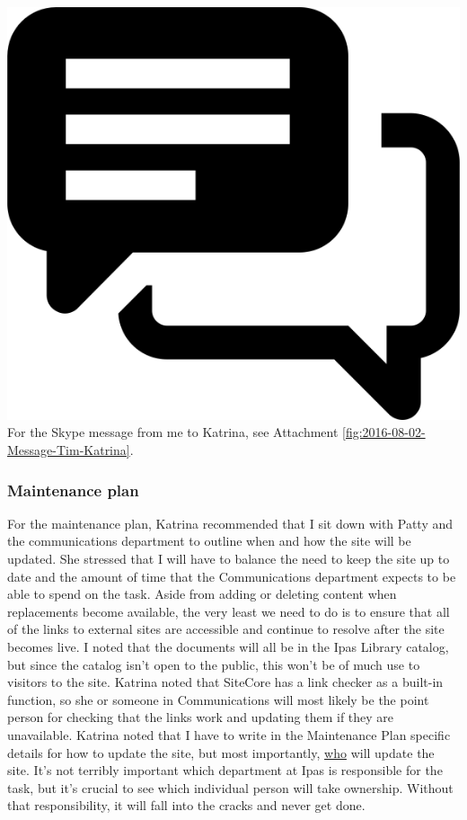 \documentclass{article}
\begin{document}
\vspace{2em}
\noindent\includegraphics[height=\fontcharht\font`\B]{icons/attachment-message} For the Skype message from me to Katrina, see Attachment \ref{fig:2016-08-02-Message-Tim-Katrina}.
\vspace{2em}

\subsubsection{Maintenance plan}
For the maintenance plan, Katrina recommended that I sit down with Patty and the communications department to outline when and how the site will be updated. She stressed that I will have to balance the need to keep the site up to date and the amount of time that the Communications department expects to be able to spend on the task. Aside from adding or deleting content when replacements become available, the very least we need to do is to ensure that all of the links to external sites are accessible and continue to resolve after the site becomes live. I noted that the documents will all be in the Ipas Library catalog, but since the catalog isn't open to the public, this won't be of much use to visitors to the site. Katrina noted that SiteCore has a link checker as a built-in function, so she or someone in Communications will most likely be the point person for checking that the links work and updating them if they are unavailable. Katrina noted that I have to write in the Maintenance Plan specific details for how to update the site, but most importantly, \ul{who} will update the site. It's not terribly important which department at Ipas is responsible for the task, but it's crucial to see which individual person will take ownership. Without that responsibility, it will fall into the cracks and never get done.
\end{document}
